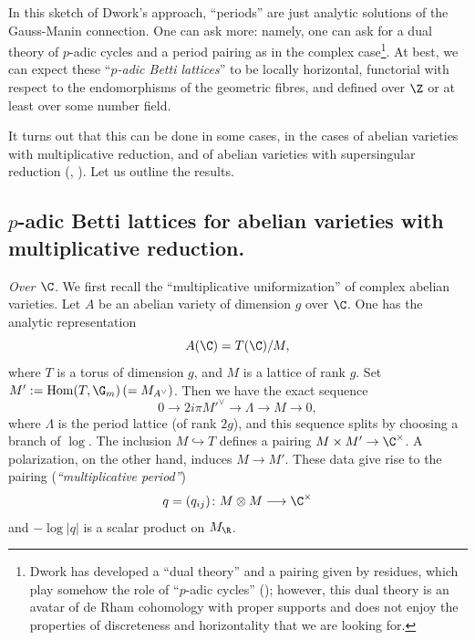 \begin{para}
 In this sketch of Dwork's approach, ``periods''
 are just analytic solutions of the Gauss-Manin connection. One can ask
 more: namely, one can ask for a dual theory of $p$-adic cycles and a
 period pairing as in the complex case\footnote{Dwork has developed a
 ``dual theory'' and a pairing given by residues, which play somehow the
 role of ``$p$-adic cycles'' (\cf \cite[5]{uinacdd}); however, this dual
 theory is an avatar of de Rham cohomology with proper supports and
 does not enjoy the properties of discreteness and horizontality that we
 are looking for.}.  At best, we can expect these ``{\it $p$-adic Betti
 lattices}'' to be locally horizontal, functorial with respect to the
 endomorphisms of the geometric fibres, and defined over $\Z$ or at least
 over some number field.

 It turns out that this can be done in some
 cases, \eg in the cases of abelian varieties with multiplicative
 reduction, and of abelian
 varieties with supersingular reduction (\cite{pbl}, \cite{tdmeigdvpdg}). Let
us outline the results.
\end{para}
  

\subsection{$p$-adic Betti lattices for abelian varieties with 
multiplicative reduction.}\label{sub-p-adic-betti-lattice}

\begin{para}\label{para-multi-uniformize}
 {\itshape Over $\C$.}
 We first recall the ``multiplicative uniformization'' of complex
 abelian varieties.  Let $A$ be an abelian variety of dimension $g$ over
 $\C$.  One has the analytic representation
 \begin{equation*}
  A(\C)=T(\C)/M,
 \end{equation*}
 where $T$ is a torus of dimension $g$, and $M$ is a lattice of rank
 $g$.  Set $M' :=\mathrm{Hom}(T,\G_m)\,(=M_{A^{\vee}})$.  Then we
 have the exact sequence
 \begin{equation*}
  0\longrightarrow 2i\pi {M'}^{\vee}\longrightarrow\Lambda\longrightarrow
   M\longrightarrow 0,
 \end{equation*}
 where $\Lambda$ is the period lattice (of rank $2g$), and this sequence
 splits by choosing a branch of $\log$.  The inclusion $M\hookrightarrow
 T$ defines a pairing $M\times M' \rightarrow\C^{\times}$.  A
 polarization, on the other hand, induces $M\rightarrow M'$.  These
 data give rise to the pairing ({\it ``multiplicative period''})
\begin{equation*}
 q=(q_{ij})\colon M\otimes M\longrightarrow\C^{\times}
\end{equation*}
and $-\log|q|$ is a scalar product on $M_{\R}$.
\end{para}


